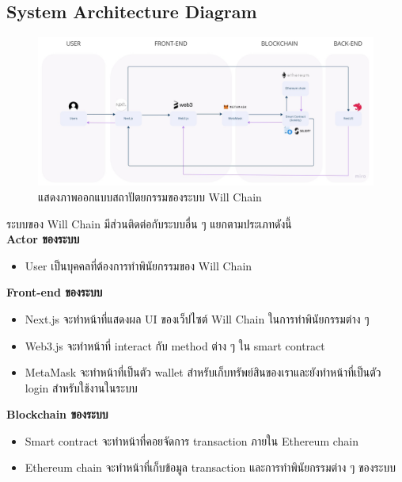 \documentclass[12pt,oneside,openright,a4paper]{cpe-thai-project}
\begin{document}
\subsection{System Architecture Diagram}
	\begin{figure}[!thb]
		\centering
		\includegraphics[scale=0.2]{systemArch}
		\caption{แสดงภาพออกแบบสถาปัตยกรรมของระบบ Will Chain}
	\end{figure}
	\FloatBarrier
ระบบของ Will Chain มีส่วนติดต่อกับระบบอื่น ๆ แยกตามประเภทดังนี้ \\
\textbf{Actor ของระบบ}
	\begin{itemize}
		\item User เป็นบุคคลที่ต้องการทำพินัยกรรมของ Will Chain
	\end{itemize}
\textbf{Front-end ของระบบ}
	\begin{itemize}
		\item Next.js จะทำหน้าที่แสดงผล UI ของเว็ปไซต์ Will Chain ในการทำพินัยกรรมต่าง ๆ 
		\item Web3.js จะทำหน้าที่ interact กับ method ต่าง ๆ ใน smart contract
		\item MetaMask จะทำหน้าที่เป็นตัว wallet สำหรับเก็บทรัพย์สินของเราและยังทำหน้าที่เป็นตัว login สำหรับใช้งานในระบบ
	\end{itemize}
\textbf{Blockchain ของระบบ}
	\begin{itemize}
		\item Smart contract จะทำหน้าที่คอยจัดการ transaction ภายใน Ethereum chain
		\item Ethereum chain จะทำหน้าที่เก็บข้อมูล transaction และการทำพินัยกรรมต่าง ๆ ของระบบ
	\end{itemize}
\clearpage
\end{document}
